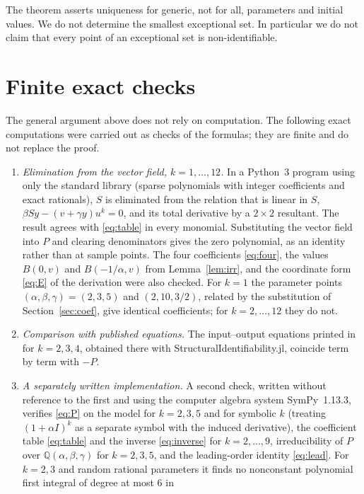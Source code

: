\documentclass[10pt,a4paper]{article}
\theoremstyle{definition}
\theoremstyle{remark}
\begin{document}
The theorem asserts uniqueness for generic, not for all, parameters and
initial values. We do not determine the smallest exceptional set. In
particular we do not claim that every point of an exceptional set is
non-identifiable.

\section{Finite exact checks}
\label{sec:checks}
The general argument above does not rely on computation. The following
exact computations were carried out as checks of the formulas; they are
finite and do not replace the proof.

\begin{enumerate}
\item \emph{Elimination from the vector field, $k=1,\dots,12$.} In a
Python~3 program using only the standard library (sparse polynomials
with integer coefficients and exact rationals), $S$ is eliminated from the relation that
is linear in $S$, $\beta Sy-(v+\gamma y)u^k=0$, and its total derivative
by a $2\times2$ resultant. The result agrees with \eqref{eq:table} in
every monomial. Substituting the vector field into $P$ and clearing
denominators gives the zero polynomial, as an identity rather than at
sample points. The four coefficients \eqref{eq:four}, the values $B(0,v)$
and $B(-1/\alpha,v)$ from Lemma~\ref{lem:irr}, and the coordinate form
\eqref{eq:E} of the derivation were also checked. For $k=1$ the
parameter points $(\alpha,\beta,\gamma)=(2,3,5)$ and $(2,10,3/2)$, related
by the substitution of Section~\ref{sec:coef}, give identical
coefficients; for $k=2,\dots,12$ they do not.
\item \emph{Comparison with published equations.} The input--output
equations printed in \cite[Section~S9]{PSPsupp} for $k=2,3,4$, obtained
there with \mbox{StructuralIdentifiability.jl}, coincide term by term with
$-P$.
\item \emph{A separately written implementation.} A second check, written
without reference to the first and using the computer algebra system
SymPy~1.13.3, verifies \eqref{eq:P} on the model for $k=2,3,5$ and for symbolic $k$
(treating $(1+\alpha I)^k$ as a separate symbol with the induced
derivative), the coefficient table \eqref{eq:table} and the inverse
\eqref{eq:inverse} for $k=2,\dots,9$, irreducibility of $P$ over
$\mathbb Q(\alpha,\beta,\gamma)$ for $k=2,3,5$, and the leading-order
identity \eqref{eq:lead}. For $k=2,3$ and random rational parameters it
finds no nonconstant polynomial first integral of degree at most $6$ in

\end{enumerate}
\end{document}
